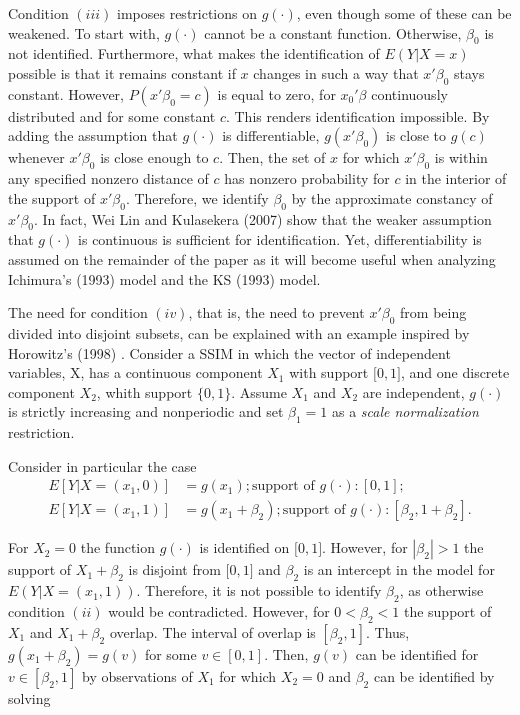Condition $(iii)$ imposes restrictions on $g(\cdot)$, even though some of these can be weakened. To start with, $g(\cdot)$ cannot be a constant function. Otherwise, $\beta_0$ is not identified. Furthermore, what makes the identification of $E(Y|X = x)$ possible is that it remains constant if $x$ changes in such a way that $x'\beta_0$ stays constant. However, $P(x'\beta_0 = c)$ is equal to zero, for $x_0'\beta$ continuously distributed and for some constant $c$. This renders identification impossible. By adding the assumption that $g(\cdot)$ is differentiable, $g(x'\beta_0)$ is close to $g(c)$ whenever $x'\beta_0$ is close enough to $c$. Then, the set of $x$ for which $x'\beta_0$ is within any specified nonzero distance of $c$ has nonzero probability for $c$ in the interior of the support of $x'\beta_0$. Therefore, we identify $\beta_0$ by the approximate constancy of $x'\beta_0$. In fact, Wei Lin and Kulasekera (2007) \cite{[14]} show that the weaker assumption that $g(\cdot)$ is continuous is sufficient for identification. Yet, differentiability is assumed on the remainder of the paper as it will become useful when analyzing Ichimura's (1993) \cite{[6]} model and the KS (1993) \cite{[12]} model.

The need for condition $(iv)$, that is,  the need to prevent $x'\beta_0$  from being divided into disjoint subsets, can be explained with an example inspired by Horowitz's (1998) \cite{[13]}. Consider a SSIM in which the vector of independent variables, X, has a continuous component $X_1$ with support $\big[0,1\big]$, and one discrete component $X_2$, whith support $\{0,1\}$. Assume $X_1$ and $X_2$ are independent, $g(\cdot)$ is strictly increasing and nonperiodic and set $\beta_1 = 1$ as a \textit{scale normalization} restriction. 

Consider in particular the case
\[
\begin{split}
E[Y| X = (x_1,0)]& = g(x_1); \text{support\ of } g(\cdot): [0,1];  \\
E[Y| X = (x_1,1)]& = g(x_1+\beta_2); \text{support\ of } g(\cdot): [\beta_2,1+\beta_2].
\end{split}
\]

For $X_2 = 0$ the function $g(\cdot)$ is identified on $\big[0,1\big]$. However, for $|\beta_2| > 1$ the support of $ X_1 + \beta_2$ is disjoint from $\big[0,1\big]$ and $\beta_2$ is an intercept in the model for $E(Y|X=(x_1,1))$. Therefore, it is not possible to identify $\beta_2$, as otherwise condition $(ii)$ would be contradicted. However, for $0<\beta_2 < 1$ the support of $X_1$ and $X_1 + \beta_2$ overlap. The interval of overlap is $[\beta_2, 1]$. Thus, $g(x_1 + \beta_2) = g(v)$ for some $v \in [0,1]$. Then, $g(v)$ can be identified for $v \in [\beta_2, 1]$ by observations of $X_1$ for which $X_2 = 0$ and $\beta_2$ can be identified by solving

